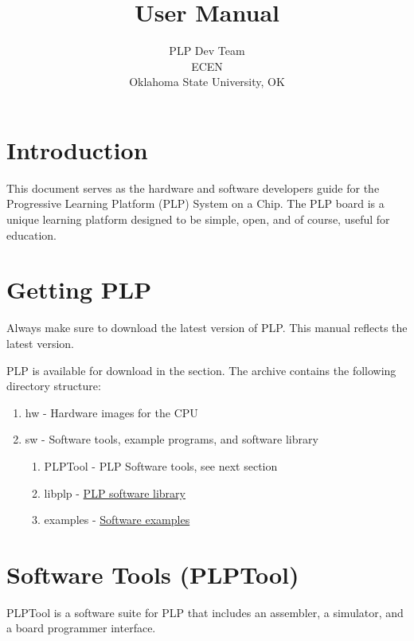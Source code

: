 \documentclass{article}
\begin{document}
\title{User Manual}
\author{PLP Dev Team\\
        ECEN \\
        Oklahoma State University, OK}
        
\maketitle
\pagebreak
\tableofcontents

\section{Introduction}
This document serves as the hardware and software developers guide for the 
Progressive Learning Platform (PLP) System on a Chip. The PLP board is a 
unique learning platform designed to be simple, open, and of course, useful 
for education. 
\section{Getting PLP}
Always make sure to download the latest version of PLP. This manual 
reflects the latest version.

PLP is available for download in the 
section. The archive contains the following directory structure:

\begin{enumerate}
\item hw - Hardware images for the CPU
\item sw - Software tools, example programs, and software library
	\begin{enumerate}
	\item PLPTool - PLP Software tools, see next section
	\item libplp - \href{http://code.google.com/p/progressive-learning-platform/wiki/libplp}{PLP software library}
	\item examples - \href{http://code.google.com/p/progressive-learning-platform/wiki/SoftwareExamples}{Software examples}
	\end{enumerate} 
\end{enumerate} 

\section{Software Tools (PLPTool)}
PLPTool is a software suite for PLP that includes an assembler, a simulator, 
and a board programmer interface. 
\end{document}
